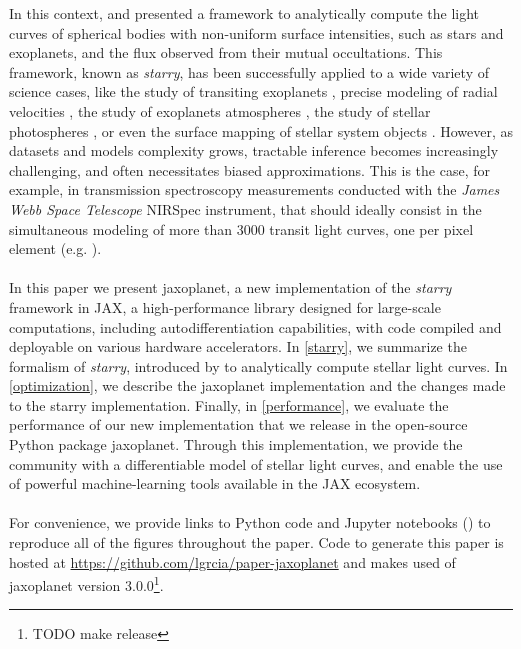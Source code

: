 \documentclass[modern]{aastex631}
\begin{document}
In this context, \cite{starry} and \cite{Agol2020} presented a framework to analytically compute the light curves of spherical bodies with non-uniform surface intensities, such as stars and exoplanets, and the flux observed from their mutual occultations. This framework, known as \textit{starry}, has been successfully applied to a wide variety of science cases, like the study of transiting exoplanets \citep{Kostov2019}, precise modeling of radial velocities \citep{Dawson2021}, the study of exoplanets atmospheres \citep{Bell2023}, the study of stellar photospheres \citep{Almenara2022}, or even the surface mapping of stellar system objects \citep{Bartolic2022}. However, as datasets and models complexity grows, tractable inference becomes increasingly challenging, and often necessitates biased approximations. This is the case, for example, in transmission spectroscopy measurements conducted with the \textit{James Webb Space Telescope} NIRSpec instrument, that should ideally consist in the simultaneous modeling of more than 3000 transit light curves, one per pixel element (e.g. \citealt{Alderson2023}).\\\\
In this paper we present \textsf{jaxoplanet}, a new implementation of the \textit{starry} framework in \textsf{JAX}, a high-performance library designed for large-scale computations, including autodifferentiation capabilities, with code compiled and deployable on various hardware accelerators. In \autoref{starry}, we summarize the formalism of \textit{starry}, introduced by \cite{starry} to analytically compute stellar light curves. In \autoref{optimization}, we describe the \textsf{jaxoplanet} implementation and the changes made to the \textsf{starry} implementation. Finally, in \autoref{performance}, we evaluate the performance of our new implementation that we release in the open-source Python package \textsf{jaxoplanet}. Through this implementation, we provide the community with a differentiable model of stellar light curves, and enable the use of powerful machine-learning tools available in the \textsf{JAX} ecosystem.\\\\
For convenience, we provide links to Python code and Jupyter notebooks (\;\codelink{}) to reproduce all of the figures throughout the paper. Code to generate this paper is hosted at \href{https://github.com/lgrcia/paper-jaxoplanet}{https://github.com/lgrcia/paper-jaxoplanet} and makes used of \textsf{jaxoplanet} version 3.0.0\footnote{TODO make release}.
\end{document}
